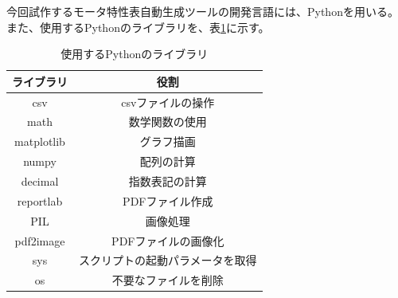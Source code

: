 今回試作するモータ特性表自動生成ツールの開発言語には、Pythonを用いる。
また、使用するPythonのライブラリを、表\ref{tab:libr}に示す。
\begin{table}[t]
	\centering
	\caption{使用するPythonのライブラリ}
	\begin{tabular}{|c|c|} \hline
	  ライブラリ & 役割\\ \hline \hline
	  csv & csvファイルの操作 \\ \hline
	  math &  数学関数の使用\\ \hline
	  matplotlib & グラフ描画\\ \hline
	  numpy &  配列の計算\\ \hline
	  decimal &  指数表記の計算\\ \hline
	  reportlab & PDFファイル作成 \\ \hline
	  PIL &  画像処理\\ \hline
	  pdf2image &  PDFファイルの画像化\\ \hline
	  sys & スクリプトの起動パラメータを取得\\ \hline
	  os &  不要なファイルを削除\\ \hline
	\end{tabular}
	\label{tab:libr}
  \end{table}



